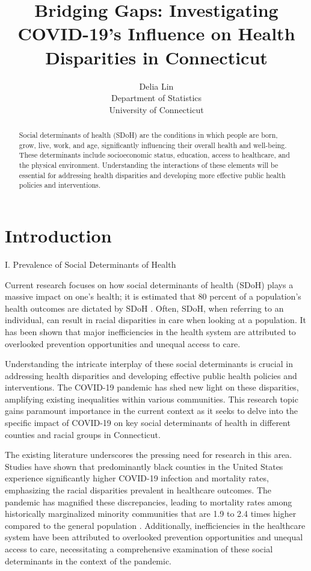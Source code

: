 \documentclass[12pt]{article}
\title{Bridging Gaps: Investigating COVID-19's Influence on Health Disparities in Connecticut}
\author{Delia Lin\\
  Department of Statistics\\
  University of Connecticut
}
\begin{document}
\maketitle

\begin{abstract}
  Social determinants of health (SDoH) are the conditions in which people are born, 
  grow, live, work, and age, significantly influencing their overall health and well-being. 
  These determinants include socioeconomic status, education, access to healthcare, and the 
  physical environment. Understanding the interactions of these elements will be essential for 
  addressing health disparities and developing more effective public health policies and interventions.
\end{abstract}

\section{Introduction}\label{sec:intro}

I. Prevalence of Social Determinants of Health 

Current research focuses on how social determinants of health (SDoH) plays a  massive
impact on one's health; it is estimated that 80 percent of a population's health outcomes are 
dictated by SDoH \citep{HOOD2016129}. Often, SDoH, when referring to an individual, can result in racial 
disparities in care when looking at a population\citep{Monroe2023-uq}. It has been shown that major inefficiencies
in the health system are attributed to overlooked prevention opportunities and unequal access
to care.\citep{Allin2014-xn}

Understanding the intricate interplay of these social determinants is crucial in addressing health disparities 
and developing effective public health policies and interventions. The COVID-19 pandemic has shed new light on 
these disparities, amplifying existing inequalities within various communities. This research topic gains paramount 
importance in the current context as it seeks to delve into the specific impact of COVID-19 on key social determinants 
of health in different counties and racial groups in Connecticut.

The existing literature underscores the pressing need for research in this area. Studies have shown that predominantly 
black counties in the United States experience significantly higher COVID-19 infection and mortality rates, emphasizing 
the racial disparities prevalent in healthcare outcomes. The pandemic has magnified these discrepancies, leading to 
mortality rates among historically marginalized minority communities that are 1.9 to 2.4 times higher compared to the 
general population \citep{Badalov2022-wt}. Additionally, inefficiencies in the healthcare system have been attributed 
to overlooked prevention opportunities and unequal access to care, necessitating a comprehensive examination 
of these social determinants in the context of the pandemic.
\end{document}
